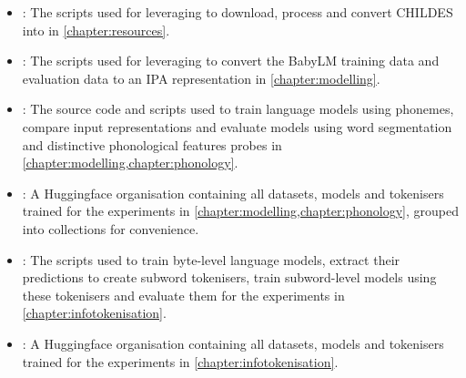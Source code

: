 \begin{itemize}
    \item \href{https://github.com/codebyzeb/childes-processor}{}: The scripts used for leveraging \gpp to download, process and convert CHILDES into \ipachildes in \cref{chapter:resources}.
    \item \href{https://github.com/codebyzeb/babylm-ipa}{}: The scripts used for leveraging \gpp to convert the BabyLM training data and evaluation data to an IPA representation in \cref{chapter:modelling}.
    \item \href{https://github.com/codebyzeb/PhonemeTransformers}{}: The source code and scripts used to train language models using phonemes, compare input representations and evaluate models using word segmentation and distinctive phonological features probes in \cref{chapter:modelling,chapter:phonology}. 
    \item \href{https://huggingface.co/phonemetransformers}{}: A Huggingface organisation containing all datasets, models and tokenisers trained for the experiments in \cref{chapter:modelling,chapter:phonology}, grouped into collections for convenience.
    \item \href{https://github.com/codebyzeb/bytespantokenisation}{}: The scripts used to train byte-level language models, extract their predictions to create subword tokenisers, train subword-level models using these tokenisers and evaluate them for the experiments in \cref{chapter:infotokenisation}.
    \item \href{https://huggingface.co/bytespantokenisers}{}: A Huggingface organisation containing all datasets, models and tokenisers trained for the experiments in \cref{chapter:infotokenisation}.
\end{itemize}
